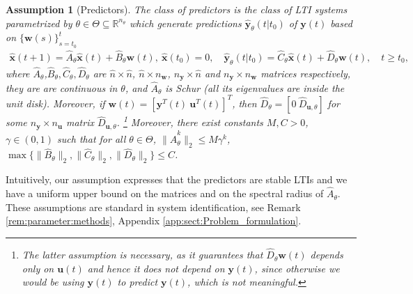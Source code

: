 \documentclass{article}
\def\rvu{{\mathbf{i}}}
\def\rvu{{\mathbf{u}}}
\def\rvy{{\mathbf{y}}}
\newtheorem{assumption}[theorem]{Assumption}
\newtheorem{remark}[theorem]{Remark}
\newcommand{\x}{\mathbf{x}}
\newcommand{\y}{\mathbf{y}}
\newcommand{\w}{\mathbf{w}}
\begin{document}
\begin{assumption}[Predictors]\label{as:parameterisation}
The class of predictors %
is the class of LTI systems parametrized by $\theta \in \Theta \subseteq \mathbb{R}^{n_{\theta}} $ which generate 
predictions $\hat{\y}_\theta(t|t_0)$ of $\y(t)$ based on $\{\w(s)\}_{s=t_0}^{t}$
\begin{equation}\label{eq:predictor}
    \begin{aligned}
        \hat{\x}(t+1)=\hat{A}_\theta\hat{\x}(t)+\hat{B}_\theta\w(t), ~ \hat{\x}(t_0)=0, \quad \hat{\y}_\theta(t|t_0)=\hat{C}_\theta\hat{\x}(t)+\hat{D}_\theta\w(t), \quad t \ge t_0,
    \end{aligned}
\end{equation}
  where $\hat{A}_\theta$,$\hat{B}_\theta,\hat{C}_\theta,\hat{D}_\theta$ 
	are $\hat{n}\times\hat{n}$, $\hat{n}\times n_\w$,
	$n_\y\times \hat{n}$ and $n_\y\times n_\w$ matrices
	respectively, they are are continuous in $\theta$,
  and 
  $\hat{A}_\theta$ is Schur (all its eigenvalues are inside the unit disk).
  Moreover, if $\w(t)=[\y^T(t)~\rvu^T(t)]^T$, then  $\hat{D}_\theta=[0~\hat{D}_{\rvu,\theta}]$ for some $n_\y \times n_\rvu$ matrix $\hat{D}_{\rvu,\theta}$. 
  \footnote{The latter assumption is necessary, as it guarantees that $\hat{D}_\theta\w(t)$ depends only on $\rvu(t)$ and hence it does not depend on $\rvy(t)$, since otherwise we would be using $\rvy(t)$ to predict $\rvy(t)$, which is not meaningful.}
    Moreover, there exist constants
     $M,C  >0$, $\gamma \in (0,1)$ such that 
   for all $\theta \in \Theta$, $\|\hat{A}_\theta^k\|_2 \le M \gamma^k$, $\max\{\|\hat{B}_\theta\|_2,\|\hat{C}_\theta\|_2,\|\hat{D}_\theta\|_2\} \le C$.
\end{assumption}
Intuitively, our assumption expresses that the predictors are stable LTIs and we have a uniform upper bound on the matrices and on the spectral radius of $\hat{A}_\theta$. These assumptions are standard in system identification, see Remark \ref{rem:parameter:methods}, Appendix \ref{app:sect:Problem_formulation}.
\end{document}

